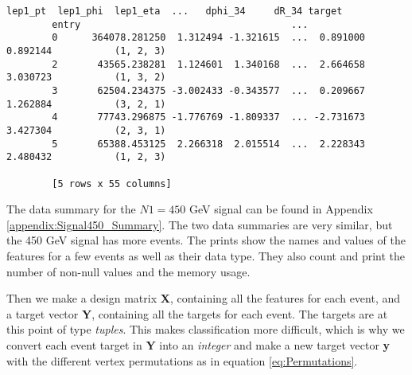 \documentclass[a4paper, american, 12pt]{report}
\begin{document}
\begin{lstlisting}[caption=Inspect data.,label=InspectData]
					 lep1_pt  lep1_phi  lep1_eta  ...   dphi_34     dR_34 target
		entry                                     ...
		0      364078.281250  1.312494 -1.321615  ...  0.891000  0.892144  			(1, 2, 3)
		2       43565.238281  1.124601  1.340168  ...  2.664658  3.030723  			(1, 3, 2)
		3       62504.234375 -3.002433 -0.343577  ...  0.209667  1.262884  			(3, 2, 1)
		4       77743.296875 -1.776769 -1.809337  ... -2.731673  3.427304  			(2, 3, 1)
		5       65388.453125  2.266318  2.015514  ...  2.228343  2.480432  			(1, 2, 3)
		
		[5 rows x 55 columns]
	\end{lstlisting}
	The data summary for the $N1=450$ GeV signal can be found in Appendix \ref{appendix:Signal450_Summary}. The two data summaries are very similar, but the 450 GeV signal has more events. The prints show the names and values of the features for a few events as well as their data type. They also count and print the number of non-null values and the memory usage. 
	
	Then we make a design matrix \textbf{X}, containing all the features for each event, and a target vector \textbf{Y}, containing all the targets for each event. The targets are at this point of type \textit{tuples}. This makes classification more difficult, which is why we convert each event target in \textbf{Y} into an \textit{integer} and make a new target vector \textbf{y} with the different vertex permutations as in equation \ref{eq:Permutations}. 
	
\end{document}
